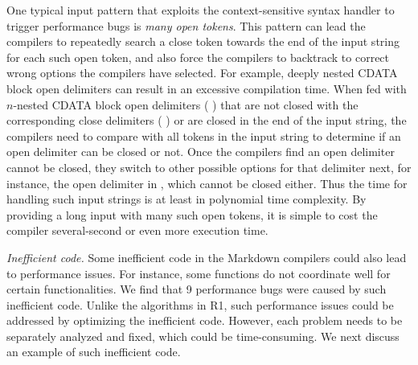 One typical input pattern that exploits the context-sensitive syntax handler to trigger performance bugs is \emph{many open tokens}.
%
This pattern can lead the compilers to repeatedly search a close token towards the end of the input string for each such open token, and also force the compilers to backtrack to correct wrong options the compilers have selected.
%
%
For example, deeply nested CDATA block open delimiters can result in an excessive compilation time.
%
%
%
When fed with $n$-nested CDATA block open delimiters (\eg{,} \blstinline{'<![!CDATA[<![CDATA[<![CDATA[...'}) that are not closed with the corresponding close delimiters (\ie{,} \blstinline{']]>'}) or are closed in the end of the input string,
%
the compilers need to compare with all tokens in the input string to determine if an open delimiter can be closed or not.
%
Once the compilers find an open delimiter cannot be closed, they switch to other possible options for that delimiter next, for instance, the open delimiter  in , which cannot be closed either.
%
%
Thus the time for handling such input strings is at least in polynomial time complexity.
%
By providing a long input with many such open tokens, it is simple to cost the compiler several-second or even more execution time.


 \emph{Inefficient code.}
%
Some inefficient code in the Markdown compilers could also lead to performance issues.
%
For instance, some functions do not coordinate well for certain functionalities.
%
We find that 9 performance bugs were caused by such inefficient code.
%
Unlike the algorithms in R1, such performance issues could be addressed by optimizing the inefficient code.
%
However, each problem needs to be separately analyzed and fixed, which could be time-consuming.
%
We next discuss an example of such inefficient code.
%

